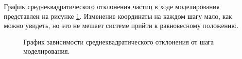 \documentclass[14pt,a4paper,report]{ncc}
\begin{document}
График среднеквадратического отклонения частиц в ходе моделирования представлен на рисунке \ref{ris:image5}. Изменение координаты на каждом шагу мало, как можно увидеть, но это не мешает системе прийти к равновесному положению.
\begin{figure}[h]
\caption{График зависимости среднеквадратического отклонения от шага моделирования.}
\label{ris:image5}
\end{figure}
\ 
\end{document}
